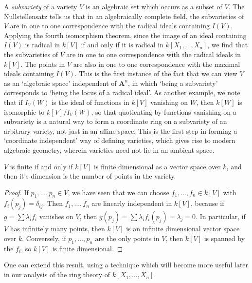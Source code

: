 A \emph{subvariety} of a variety $V$ is an algebraic set which occurs as a subset of $V$. The Nullstellensatz tells us that in an algebraically complete field, the subvarieties of $V$ are in one to one correspondence with the radical ideals containing $I(V)$. Applying the fourth isomorphism theorem, since the image of an ideal containing $I(V)$ is radical in $k[V]$ if and only if it is radical in $k[X_1,\dots,X_n]$, we find that the subvarieties of $V$ are in one to one correspondence with the radical ideals in $k[V]$. The points in $V$ are also in one to one correspondence with the maximal ideals containing $I(V)$. This is the first instance of the fact that we can view $V$ as an `algebraic space' independent of $\mathbf{A}^n$, in which `being a subvariety' corresponds to `being the locus of a radical ideal'. As another example, we note that if $I_V(W)$ is the ideal of functions in $k[V]$ vanishing on $W$, then $k[W]$ is isomorphic to $k[V]/I_V(W)$, so that quotienting by functions vanishing on a subvariety is a natural way to form a coordinate ring on a subvariety of an arbitrary variety, not just in an affine space. This is the first step in forming a `coordinate independent' way of defining varieties, which gives rise to modern algebraic geometry, wherein varieties need not lie in an ambient space.

\begin{prop}
    $V$ is finite if and only if $k[V]$ is finite dimensional as a vector space over $k$, and then it's dimension is the number of points in the variety.
\end{prop}
\begin{proof}
    If $p_1, \dots, p_n \in V$, we have seen that we can choose $f_1, \dots, f_n \in k[V]$ with $f_i(p_j) = \delta_{ij}$. Then $f_1, \dots, f_n$ are linearly independent in $k[V]$, because if $g = \sum \lambda_i f_i$ vanishes on $V$, then $g(p_j) = \sum \lambda_i f_i(p_j) = \lambda_j = 0$. In particular, if $V$ has infinitely many points, then $k[V]$ is an infinite dimensional vector space over $k$. Conversely, if $p_1, \dots, p_n$ are the only points in $V$, then $k[V]$ is spanned by the $f_i$, so $k[V]$ is finite dimensional.
\end{proof}

One can extend this result, using a technique which will become more useful later in our analysis of the ring theory of $k[X_1, \dots, X_n]$.

